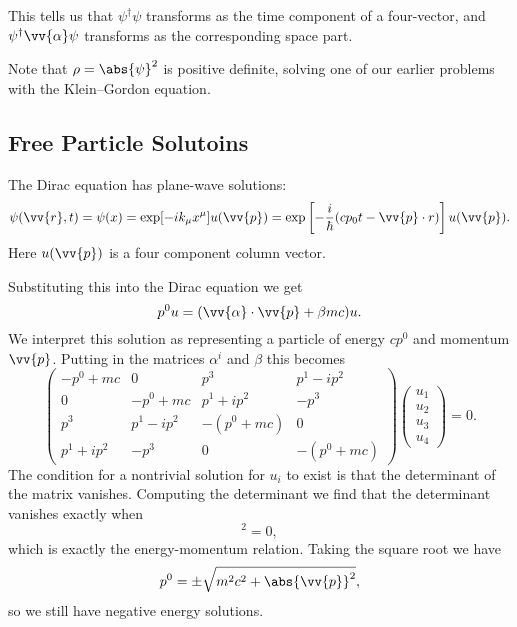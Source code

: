 \documentclass[fleqn]{NotesClass}
\newcommand{\hermit}{{\dagger}}
\begin{document}
\begin{appendices}
        This tells us that \(\psi^\hermit \psi\) transforms as the time component of a four-vector, and \(\psi^\hermit \vv{\alpha} \psi\) transforms as the corresponding space part.
        
        Note that \(\rho = \abs{\psi}^2\) is positive definite, solving one of our earlier problems with the Klein--Gordon equation.
        
        \subsection{Free Particle Solutoins}
        The Dirac equation has plane-wave solutions:
        \begin{equation}
            \psi(\vv{r}, t) = \psi(x) = \exp[-ik_\mu x^\mu]u(\vv{p}) = \exp\left[ -\frac{i}{\hbar}(cp_0t - \vv{p} \cdot r) \right]u(\vv{p}).
        \end{equation}
        Here \(u(\vv{p})\) is a four component column vector.
        
        Substituting this into the Dirac equation we get
        \begin{equation}
            p^0u = (\vv{\alpha} \cdot \vv{p} + \beta mc)u.
        \end{equation}
        We interpret this solution as representing a particle of energy \(cp^0\) and momentum \(\vv{p}\).
        Putting in the matrices \(\alpha^i\) and \(\beta\) this becomes
        \begin{equation}\label{eqn:dirac equation wave solution matrix form}
            \begin{pmatrix}
                -p^0 + mc & 0 & p^3 & p^1 - ip^2\\
                0 & -p^0 + mc & p^1 + ip^2 & -p^3\\
                p^3 & p^1 - ip^2 & -(p^0 + mc) & 0\\
                p^1 + ip^2 & -p^3 & 0 & -(p^0 + mc)
            \end{pmatrix}
            \begin{pmatrix}
                u_1\\ u_2\\ u_3\\ u_4
            \end{pmatrix}
            = 0.
        \end{equation}
        The condition for a nontrivial solution for \(u_i\) to exist is that the determinant of the matrix vanishes.
        Computing the determinant we find that the determinant vanishes exactly when
        \begin{equation}
            [m^2 c^2 + \abs{\vv{p}}^2 - (p^0)^2]^2 = 0,
        \end{equation}
        which is exactly the energy-momentum relation.
        Taking the square root we have
        \begin{equation}
            p^0 = \pm \sqrt{m^2c^2 + \abs{\vv{p}}^2},
        \end{equation}
        so we still have negative energy solutions.
        

\end{appendices}
\end{document}
